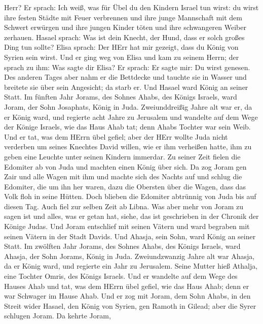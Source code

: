 Herr? Er sprach: Ich weiß, was für Übel du den Kindern Israel tun wirst:
du wirst ihre festen Städte mit Feuer verbrennen und ihre junge
Mannschaft mit dem Schwert erwürgen und ihre jungen Kinder töten und
ihre schwangeren Weiber zerhauen.  Hasael sprach: Was ist
dein Knecht, der Hund, dass er solch großes Ding tun sollte? Elisa
sprach: Der HErr hat mir gezeigt, dass du König von Syrien sein wirst.
 Und er ging weg von Elisa und kam zu seinem Herrn; der
sprach zu ihm: Was sagte dir Elisa? Er sprach: Er sagte mir: Du wirst
genesen.  Des anderen Tages aber nahm er die Bettdecke und
tauchte sie in Wasser und breitete sie über sein Angesicht; da starb er.
Und Hasael ward König an seiner Statt.  Im fünften Jahr
Jorams, des Sohnes Ahabs, des Königs Israels, ward Joram, der Sohn
Josaphats, König in Juda.  Zweiunddreißig Jahre alt war er,
da er König ward, und regierte acht Jahre zu Jerusalem  und
wandelte auf dem Wege der Könige Israels, wie das Haus Ahab tat; denn
Ahabs Tochter war sein Weib. Und er tat, was dem HErrn übel gefiel;
 aber der HErr wollte Juda nicht verderben um seines
Knechtes David willen, wie er ihm verheißen hatte, ihm zu geben eine
Leuchte unter seinen Kindern immerdar.  Zu seiner Zeit
fielen die Edomiter ab von Juda und machten einen König über sich.
 Da zog Joram gen Zair und alle Wagen mit ihm und machte
sich des Nachts auf und schlug die Edomiter, die um ihn her waren, dazu
die Obersten über die Wagen, dass das Volk floh in seine Hütten.
 Doch blieben die Edomiter abtrünnig von Juda bis auf
diesen Tag. Auch fiel zur selben Zeit ab Libna.  Was aber
mehr von Joram zu sagen ist und alles, was er getan hat, siehe, das ist
geschrieben in der Chronik der Könige Judas.  Und Joram
entschlief mit seinen Vätern und ward begraben mit seinen Vätern in der
Stadt Davids. Und Ahasja, sein Sohn, ward König an seiner Statt.
 Im zwölften Jahr Jorams, des Sohnes Ahabs, des Königs
Israels, ward Ahasja, der Sohn Jorams, König in Juda. 
Zweiundzwanzig Jahre alt war Ahasja, da er König ward, und regierte ein
Jahr zu Jerusalem. Seine Mutter hieß Athalja, eine Tochter Omris, des
Königs Israels.  Und er wandelte auf dem Wege des Hauses
Ahab und tat, was dem HErrn übel gefiel, wie das Haus Ahab; denn er war
Schwager im Hause Ahab.  Und er zog mit Joram, dem Sohn
Ahabs, in den Streit wider Hasael, den König von Syrien, gen Ramoth in
Gilead; aber die Syrer schlugen Joram.  Da kehrte Joram,
